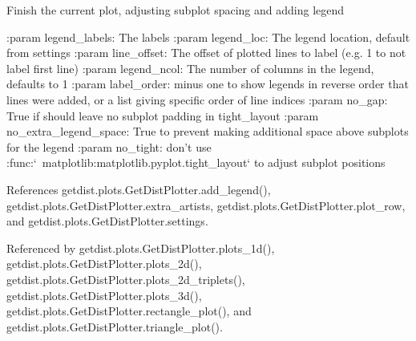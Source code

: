 \begin{DoxyVerb}Finish the current plot, adjusting subplot spacing and adding legend

:param legend_labels: The labels
:param legend_loc: The legend location, default from settings
:param line_offset: The offset of plotted lines to label (e.g. 1 to not label first line)
:param legend_ncol: The number of columns in the legend, defaults to 1 
:param label_order: minus one to show legends in reverse order that lines were added, or a list giving specific order of line indices 
:param no_gap: True if should leave no subplot padding in tight_layout
:param no_extra_legend_space: True to prevent making additional space above subplots for the legend
:param no_tight: don't use :func:`~matplotlib:matplotlib.pyplot.tight_layout` to adjust subplot positions
\end{DoxyVerb}
 

References getdist.\+plots.\+Get\+Dist\+Plotter.\+add\+\_\+legend(), getdist.\+plots.\+Get\+Dist\+Plotter.\+extra\+\_\+artists, getdist.\+plots.\+Get\+Dist\+Plotter.\+plot\+\_\+row, and getdist.\+plots.\+Get\+Dist\+Plotter.\+settings.



Referenced by getdist.\+plots.\+Get\+Dist\+Plotter.\+plots\+\_\+1d(), getdist.\+plots.\+Get\+Dist\+Plotter.\+plots\+\_\+2d(), getdist.\+plots.\+Get\+Dist\+Plotter.\+plots\+\_\+2d\+\_\+triplets(), getdist.\+plots.\+Get\+Dist\+Plotter.\+plots\+\_\+3d(), getdist.\+plots.\+Get\+Dist\+Plotter.\+rectangle\+\_\+plot(), and getdist.\+plots.\+Get\+Dist\+Plotter.\+triangle\+\_\+plot().

